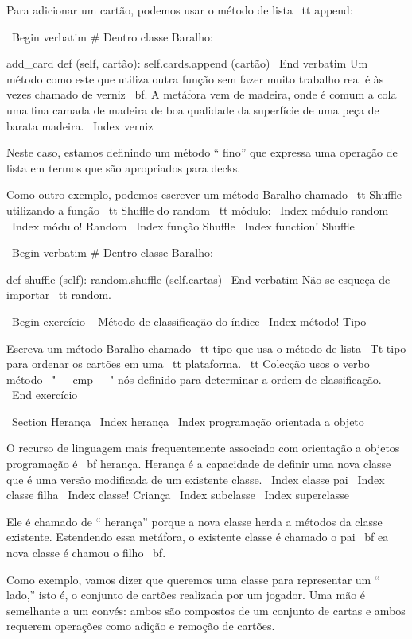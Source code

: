 \documentclass[10pt]{book}
\begin{document}
\begin {itemize}
{{{{{{{{{{{{{{{{Para adicionar um cartão, podemos usar o método de lista {\ tt append}:

\ Begin {verbatim}
# Dentro classe Baralho:

    add_card def (self, cartão):
        self.cards.append (cartão)
\ End {verbatim}
%
Um método como este que utiliza outra função sem fazer
muito trabalho real é às vezes chamado de verniz {\ bf}. A metáfora
vem de madeira, onde é comum a cola uma fina
camada de madeira de boa qualidade da superfície de uma peça de barata
madeira.
\ Index {verniz}

Neste caso, estamos definindo um método `` fino'' que expressa
uma operação de lista em termos que são apropriados para decks.

Como outro exemplo, podemos escrever um método Baralho chamado {\ tt Shuffle}
utilizando a função {\ tt Shuffle} do {random \ tt} módulo:
\ Index {módulo random}
\ Index {módulo! Random}
\ Index {função Shuffle}
\ Index {function! Shuffle}

\ Begin {verbatim}
# Dentro classe Baralho:
            
    def shuffle (self):
        random.shuffle (self.cartas)
\ End {verbatim}
%
Não se esqueça de importar {\ tt random}.

\ Begin {} exercício
\ {} Método de classificação do índice
\ Index {método! Tipo}

Escreva um método Baralho chamado {\ tt} tipo que usa o método de lista
{\ Tt tipo} para ordenar os cartões em uma {\ tt plataforma}. {\ tt Colecção} usos
o verbo método \ "__cmp__" nós definido para determinar a ordem de classificação.
\ End {} exercício



\ Section {} Herança
\ Index {herança}
\ Index {programação orientada a objeto}

O recurso de linguagem mais frequentemente associado com orientação a objetos
programação é {\ bf herança}. Herança é a capacidade de
definir uma nova classe que é uma versão modificada de um existente
classe.
\ Index {classe pai}
\ Index {classe filha}
\ Index {classe! Criança}
\ Index {subclasse}
\ Index {superclasse}

Ele é chamado de `` herança'' porque a nova classe herda a
métodos da classe existente. Estendendo essa metáfora, o existente
classe é chamado o pai {\ bf} ea nova classe é
chamou o filho {\ bf}.

Como exemplo, vamos dizer que queremos uma classe para representar um `` lado,''
isto é, o conjunto de cartões realizada por um jogador. Uma mão é semelhante a um
convés: ambos são compostos de um conjunto de cartas e ambos requerem operações
como adição e remoção de cartões.

}}}}}}}}}}}}}}}}
\end{itemize}
\end{document}
